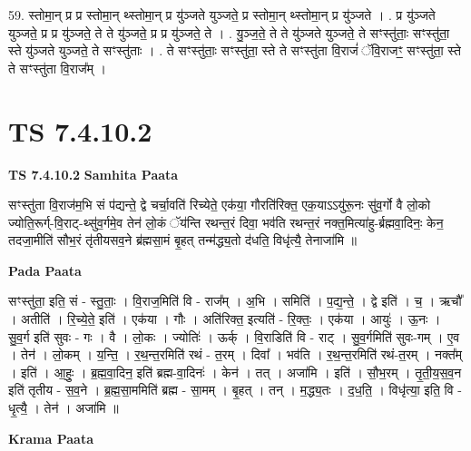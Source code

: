 \documentclass[17pt]{extarticle}
\begin{document}
59. स्तोमा॒न् प्र प्र स्तोमा॒न् थ्स्तोमा॒न् प्र यु॑ञ्जते युञ्जते॒ प्र स्तोमा॒न् थ्स्तोमा॒न् प्र यु॑ञ्जते । . प्र यु॑ञ्जते युञ्जते॒ प्र प्र यु॑ञ्जते॒ ते ते यु॑ञ्जते॒ प्र प्र यु॑ञ्जते॒ ते । . यु॒ञ्ज॒ते॒ ते ते यु॑ञ्जते युञ्जते॒ ते सꣳस्तु॑ताः॒ सꣳस्तु॑ता॒ स्ते यु॑ञ्जते युञ्जते॒ ते सꣳस्तु॑ताः । . ते सꣳस्तु॑ताः॒ सꣳस्तु॑ता॒ स्ते ते सꣳस्तु॑ता वि॒राजं॑ ॅवि॒राजꣳ॒॒ सꣳस्तु॑ता॒ स्ते ते सꣳस्तु॑ता वि॒राज᳚म् । \newline
\pagebreak
{}

\section{ TS 7.4.10.2 }

\textbf{TS 7.4.10.2 } \newline
\textbf{Samhita Paata} \newline

सꣳस्तु॑ता वि॒राज॑म॒भि सं प॑द्यन्ते॒ द्वे चर्चा॒वति॑ रिच्येते॒ एक॑या॒ गौरति॑रिक्त॒ एक॒याऽऽयु॑रू॒नः सु॑व॒र्गो वै लो॒को ज्योति॒रूर्ग्-वि॒राट्-थ्सु॑व॒र्गमे॒व तेन॑ लो॒कं ॅय॑न्ति रथन्त॒रं दिवा॒ भव॑ति रथन्त॒रं नक्त॒मित्या॑हु-र्ब्रह्मवा॒दिनः॒ केन॒ तदजा॒मीति॑ सौभ॒रं तृ॑तीयसव॒ने ब्र॑ह्मसा॒मं बृ॒हत् तन्म॑द्ध्य॒तो द॑धति॒ विधृ॑त्यै॒ तेनाजा॑मि ॥ \newline

\textbf{Pada Paata} \newline

सꣳस्तु॑ता॒ इति॒ सं - स्तु॒ताः॒ । वि॒राज॒मिति॑ वि - राज᳚म् । अ॒भि । समिति॑ । प॒द्य॒न्ते॒ । द्वे इति॑ । च॒ । ऋचौ᳚ । अतीति॑ । रि॒च्ये॒ते॒ इति॑ । एक॑या । गौः । अति॑रिक्त॒ इत्यति॑ - रि॒क्तः॒ । एक॑या । आयुः॑ । ऊ॒नः । सु॒व॒र्ग इति॑ सुवः - गः । वै । लो॒कः । ज्योतिः॑ । ऊर्क् । वि॒राडिति॑ वि - राट् । सु॒व॒र्गमिति॑ सुवः-गम् । ए॒व । तेन॑ । लो॒कम् । य॒न्ति॒ । र॒थ॒न्त॒रमिति॑ रथं - त॒रम् । दिवा᳚ । भव॑ति । र॒थ॒न्त॒रमिति॑ रथं-त॒रम् । नक्त᳚म् । इति॑ । आ॒हुः॒ । ब्र॒ह्म॒वा॒दिन॒ इति॑ ब्रह्म-वा॒दिनः॑ । केन॑ । तत् । अजा॑मि । इति॑ । सौ॒भ॒रम् । तृ॒ती॒य॒स॒व॒न इति॑ तृतीय - स॒व॒ने । ब्र॒ह्म॒सा॒ममिति॑ ब्रह्म - सा॒मम् । बृ॒हत् । तन् । म॒द्ध्य॒तः । द॒ध॒ति॒ । विधृ॑त्या॒ इति॒ वि - धृ॒त्यै॒ । तेन॑ । अजा॑मि ॥  \newline


\textbf{Krama Paata} \newline
\end{document}
